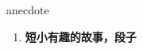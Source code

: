 
\begin{frame}
{\huge anecdote}
\begin{center}
\begin{enumerate}\Large
  \item \textbf{短小有趣的故事，段子}
\end{enumerate}
\end{center}
\end{frame}
